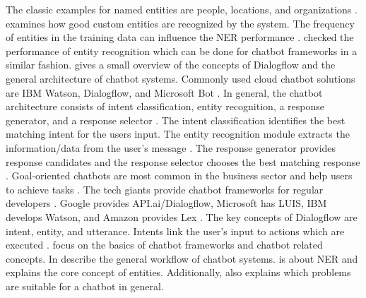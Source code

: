 The classic examples for named entities are people, locations, and organizations \cite{geyer2016named}.
\citet{geyer2016named} examines how good custom entities are recognized by the system.
The frequency of entities in the training data can influence the NER performance \cite{geyer2016named}. 
\citet{geyer2016named} checked the performance of entity recognition which can be done for chatbot frameworks in a similar fashion.
\citet{rahman2017programming} gives a small overview of the concepts of Dialogflow and the general architecture of chatbot systems.
Commonly used cloud chatbot solutions are IBM Watson, Dialogflow, and Microsoft Bot \cite{rahman2017programming}.
In general, the chatbot architecture consists of intent classification, entity recognition, a response generator, 
and a response selector \cite{rahman2017programming}. 
The intent classification identifies the best matching intent for the users input.
The entity recognition module extracts the information/data from the user's message \cite{rahman2017programming}.
The response generator provides response candidates and the response selector chooses the best matching response \cite{rahman2017programming}.
Goal-oriented chatbots are most common in the business sector and help users to achieve tasks \cite{rahman2017programming}.
The tech giants provide chatbot frameworks for regular developers \cite{rahman2017programming}.
Google provides API.ai/Dialogflow, Microsoft has LUIS, IBM develops Watson, and Amazon provides Lex \cite{rahman2017programming}.
The key concepts of Dialogflow are intent, entity, and utterance.
Intents link the user's input to actions which are executed \cite{rahman2017programming}.
\citet{deshpande2017survey,buiildChatbotsPython,geyer2016named,rahman2017programming} focus on the 
basics of chatbot frameworks and chatbot related concepts.
In \citet{deshpande2017survey, rahman2017programming} describe the general workflow of chatbot systems.
\citet{geyer2016named} is about NER and explains the core concept of entities.
Additionally, \citet{buiildChatbotsPython} also explains which problems are suitable for a chatbot in general.

